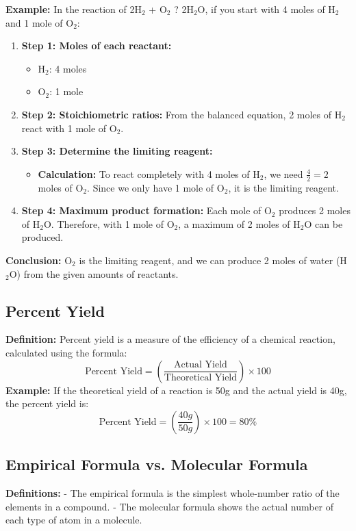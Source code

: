 \documentclass{article}
\begin{document}
\textbf{Example:} In the reaction of 2H\(_2\) + O\(_2\) ? 2H\(_2\)O, if you start with 4 moles of H\(_2\) and 1 mole of O\(_2\):
\begin{enumerate}
    \item \textbf{Step 1: Moles of each reactant:}
    \begin{itemize}
        \item H\(_2\): 4 moles  
        \item O\(_2\): 1 mole  
    \end{itemize}
    
    \item \textbf{Step 2: Stoichiometric ratios:}  
    From the balanced equation, 2 moles of H\(_2\) react with 1 mole of O\(_2\).
    
    \item \textbf{Step 3: Determine the limiting reagent:}
    \begin{itemize}
        \item \textbf{Calculation:} To react completely with 4 moles of H\(_2\), we need \( \frac{4}{2} = 2 \) moles of O\(_2\). Since we only have 1 mole of O\(_2\), it is the limiting reagent.
    \end{itemize}
    
    \item \textbf{Step 4: Maximum product formation:}
    Each mole of O\(_2\) produces 2 moles of H\(_2\)O. Therefore, with 1 mole of O\(_2\), a maximum of 2 moles of H\(_2\)O can be produced.
    
\end{enumerate}
\textbf{Conclusion:} O\(_2\) is the limiting reagent, and we can produce 2 moles of water (H\(_2\)O) from the given amounts of reactants.

\subsection*{Percent Yield}
\textbf{Definition:} Percent yield is a measure of the efficiency of a chemical reaction, calculated using the formula:
\[
\text{Percent Yield} = \left( \frac{\text{Actual Yield}}{\text{Theoretical Yield}} \right) \times 100
\]
\textbf{Example:} If the theoretical yield of a reaction is 50g and the actual yield is 40g, the percent yield is:  
\[
\text{Percent Yield} = \left( \frac{40g}{50g} \right) \times 100 = 80\%
\]

\subsection*{Empirical Formula vs. Molecular Formula}
\textbf{Definitions:} 
- The empirical formula is the simplest whole-number ratio of the elements in a compound.
- The molecular formula shows the actual number of each type of atom in a molecule.
\end{document}
